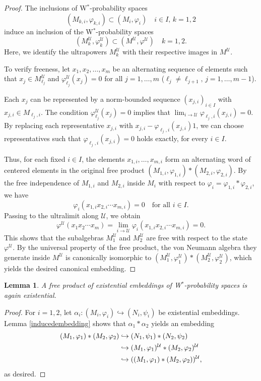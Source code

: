 \documentclass[12pt]{amsart}
\newtheorem{lem}[thm]{Lemma}
\theoremstyle{definition}
\def\cal{\mathcal}
\def\u{\mathsf 1}
\newcommand\cU{{\cal U}}
\def \u{\mathcal U}
\begin{document}
\begin{proof}
The inclusions of W$^*$-probability spaces $$(M_{k,i},\varphi_{k,i}) \subset (M_i,\varphi_i)\quad i\in I,\,k=1,2$$ induce an inclusion of the W$^*$-probability spaces $$(M_k^\mathcal{U},\varphi_k^{\cU}) \subset (M^\mathcal{U},\varphi^{\cU})\quad k=1,2.$$ Here, we identify the ultrapowers $M_k^\mathcal{U}$ with their respective images in $M^\mathcal{U}$.

To verify freeness, let $x_1, x_2, \dots, x_m$ be an alternating sequence of elements such that $x_j \in M_{\ell_j}^\mathcal{U}$ and $\varphi_{\ell_j}^\u(x_j) = 0$ for all $j=1, \dots, m$ ($\ell_j\neq \ell_{j+1},\,j=1,\dots,m-1$). 

Each $x_j$ can be represented by a norm-bounded sequence $(x_{j, i})_{i \in I}$ with $x_{j, i} \in M_{\ell_j,i}$. The condition $\varphi_{\ell_j}^\u(x_j) = 0$ implies that $\lim_{i\to \cU} \varphi_{\ell_j,i}(x_{j, i}) = 0$. By replacing each representative $x_{j, i}$ with $x_{j, i} - \varphi_{\ell_j,i}(x_{j, i})1$, we can choose representatives such that $\varphi_{\ell_j,i}(x_{j, i}) = 0$ holds exactly, for every $i\in I$. 

Thus, for each fixed $i\in I$, the elements $x_{1, i}, \dots, x_{m, i}$ form an alternating word of centered elements in the original free product $(M_{1,i},\varphi_{1,i}) * (M_{2,i},\varphi_{2,i})$. By the free independence of $M_{1,i}$ and $M_{2,i}$ inside $M_i$ with respect to $\varphi_i=\varphi_{1,i}*\varphi_{2,i}$, we have
\[
\varphi_i(x_{1, i} x_{2, i} \cdots x_{m, i}) = 0 \quad \text{for all } i\in I.
\]
Passing to the ultralimit along $\mathcal{U}$, we obtain
\[
\varphi^{\u}(x_1 x_2 \cdots x_m) = \lim_{i \to \mathcal{U}} \varphi_i(x_{1, i} x_{2, i} \cdots x_{m, i}) = 0.
\]
This shows that the subalgebras $M_1^\mathcal{U}$ and $M_2^\mathcal{U}$ are free with respect to the state $\varphi^\mathcal{U}$. By the universal property of the free product, the von Neumann algebra they generate inside $M^\mathcal{U}$ is canonically isomorphic to $(M_1^\mathcal{U}, \varphi_1^\mathcal{U}) * (M_2^\mathcal{U}, \varphi_2^\mathcal{U})$, which yields the desired canonical embedding.
\end{proof}

\begin{lem}\label{freeexistential}
A free product of existential embeddings of W$^*$-probability spaces is again existential.   
\end{lem}

\begin{proof}
For $i=1,2$, let $\alpha_i:(M_i,\varphi_i)\hookrightarrow (N_i,\psi_i)$ be existential embeddings.  Lemma \ref{inducedembedding} shows that $\alpha_1*\alpha_2$ yields an embedding \begin{alignat}{2}
(M_1,\varphi_1)*(M_2,\varphi_2)&\hookrightarrow (N_1,\psi_1)*(N_2,\psi_2)\notag \\ \notag
    &\hookrightarrow (M_1,\varphi_1)^\u*(M_2,\varphi_2)^\u\\ \notag 
    &\hookrightarrow ((M_1,\varphi_1)*(M_2,\varphi_2))^\u,
\end{alignat}
as desired.
\end{proof}
\end{document}
